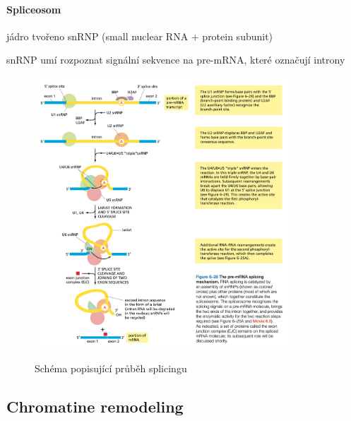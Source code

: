 \documentclass[DIV=8]{scrreprt}
\begin{document}
\paragraph{Spliceosom}
\begin{myItemize}[nosep]
    \item jádro tvořeno snRNP (small nuclear RNA + protein subunit)
    \item snRNP umí rozpoznat signální sekvence na pre-mRNA, které označují introny
\end{myItemize}



\begin{figure}
    \caption{Schéma popisující průběh splicingu}
    \includegraphics[width=0.85\textwidth]{splicing.png}
    \centering
    \label{}
\end{figure}




\subsection{Chromatine remodeling} \label{Chromatine remodeling}
\end{document}
